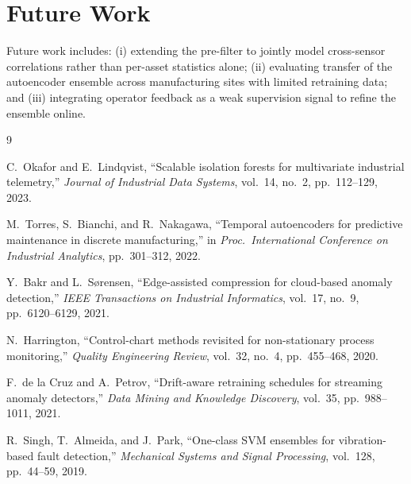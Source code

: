 \section{Future Work}
Future work includes: (i) extending the pre-filter to jointly model cross-sensor
correlations rather than per-asset statistics alone; (ii) evaluating transfer of the
autoencoder ensemble across manufacturing sites with limited retraining data; and
(iii) integrating operator feedback as a weak supervision signal to refine the ensemble
online.

\begin{thebibliography}{9}

C.~Okafor and E.~Lindqvist, ``Scalable isolation forests for multivariate industrial
telemetry,'' \textit{Journal of Industrial Data Systems}, vol.~14, no.~2, pp.~112--129, 2023.

M.~Torres, S.~Bianchi, and R.~Nakagawa, ``Temporal autoencoders for predictive maintenance
in discrete manufacturing,'' in \textit{Proc.\ International Conference on Industrial
Analytics}, pp.~301--312, 2022.

Y.~Bakr and L.~Sørensen, ``Edge-assisted compression for cloud-based anomaly detection,''
\textit{IEEE Transactions on Industrial Informatics}, vol.~17, no.~9, pp.~6120--6129, 2021.

N.~Harrington, ``Control-chart methods revisited for non-stationary process monitoring,''
\textit{Quality Engineering Review}, vol.~32, no.~4, pp.~455--468, 2020.

F.~de la Cruz and A.~Petrov, ``Drift-aware retraining schedules for streaming anomaly
detectors,'' \textit{Data Mining and Knowledge Discovery}, vol.~35, pp.~988--1011, 2021.

R.~Singh, T.~Almeida, and J.~Park, ``One-class SVM ensembles for vibration-based fault
detection,'' \textit{Mechanical Systems and Signal Processing}, vol.~128, pp.~44--59, 2019.

\end{thebibliography}

\appendix

